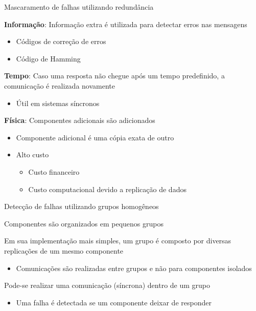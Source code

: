 \documentclass[compress]{beamer}
\begin{document}
\begin{frame}{Mascaramento de falhas utilizando redundância}

\textbf{Informação}: Informação extra é utilizada para detectar erros nas mensagens
\begin{itemize}
    \item Códigos de correção de erros
    \item Código de Hamming \href{https://pt.wikipedia.org/wiki/C\%C3\%B3digo\_de\_Hamming}{} 
\end{itemize}

\vspace{0.5cm}

\textbf{Tempo}: Caso uma resposta não chegue após um tempo predefinido, a comunicação é realizada novamente
\begin{itemize}
    \item Útil em sistemas síncronos
\end{itemize}

\vspace{0.5cm}

\textbf{Física}: Componentes adicionais são adicionados
\begin{itemize}
    \item Componente adicional é uma cópia exata de outro
    \item Alto custo
    \begin{itemize}
        \item Custo financeiro
        \item Custo computacional devido a replicação de dados
    \end{itemize}
\end{itemize}
\end{frame}


\begin{frame}{Detecção de falhas utilizando grupos homogêneos}

Componentes são organizados em pequenos grupos

\vspace{0.5cm}

Em sua implementação mais simples, um grupo é composto por diversas replicações de um mesmo componente
\begin{itemize}
    \item Comunicações são realizadas entre grupos e não para componentes isolados
\end{itemize}

\vspace{0.5cm}

Pode-se realizar uma comunicação (síncrona) dentro de um grupo
\begin{itemize}
    \item Uma falha é detectada se um componente deixar de responder
\end{itemize}
    
\end{frame}
\end{document}
